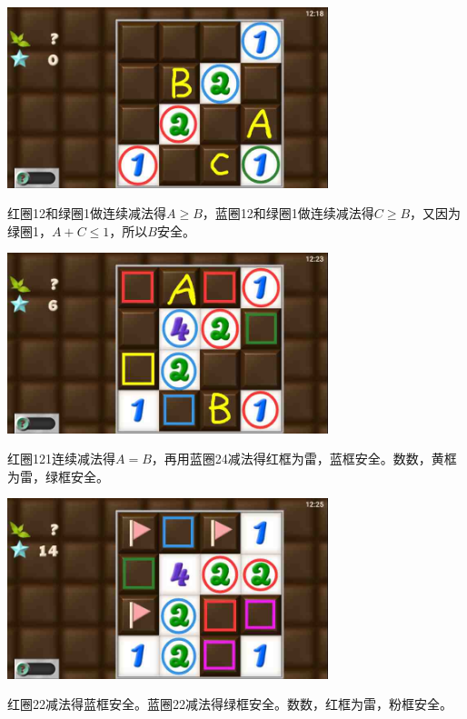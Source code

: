 \subsection{} %
\begin{center}
    \includegraphics[width=0.7\textwidth]{puzzlelow/172-1.jpg}
\end{center}
红圈12和绿圈1做连续减法得$A\ge B$，蓝圈12和绿圈1做连续减法得$C\ge B$，又因为绿圈1，$A+C\le 1$，所以$B$安全。
\begin{center}
    \includegraphics[width=0.7\textwidth]{puzzlelow/172-2.jpg}
\end{center}
红圈121连续减法得$A=B$，再用蓝圈24减法得红框为雷，蓝框安全。数数，黄框为雷，绿框安全。
\begin{center}
    \includegraphics[width=0.7\textwidth]{puzzlelow/172-3.jpg}
\end{center}
红圈22减法得蓝框安全。蓝圈22减法得绿框安全。数数，红框为雷，粉框安全。

